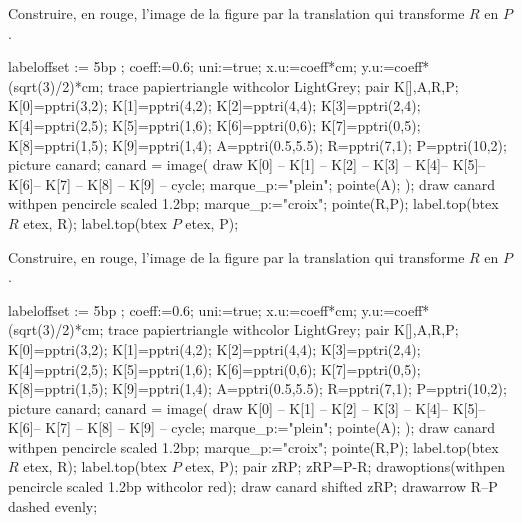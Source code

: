 \begin{exercice*}
    Construire, en rouge, l'image de la figure par la translation qui transforme $R$ en $P$.
    \begin{Geometrie}[CoinHD={(8u,4u)}]
        labeloffset := 5bp ;
        coeff:=0.6;
        uni:=true;
        x.u:=coeff*cm;
        y.u:=coeff*(sqrt(3)/2)*cm;        
        trace papiertriangle withcolor LightGrey;
        pair K[],A,R,P;
        K[0]=pptri(3,2);
        K[1]=pptri(4,2);        
        K[2]=pptri(4,4);
        K[3]=pptri(2,4);
        K[4]=pptri(2,5);
        K[5]=pptri(1,6);
        K[6]=pptri(0,6);
        K[7]=pptri(0,5);
        K[8]=pptri(1,5);
        K[9]=pptri(1,4);
        A=pptri(0.5,5.5);
        R=pptri(7,1);
        P=pptri(10,2);
        picture canard;
        canard = image( 
            draw K[0] -- K[1] -- K[2] -- K[3] -- K[4]-- K[5]-- K[6]-- K[7] -- K[8] -- K[9] -- cycle;
            marque_p:="plein";
            pointe(A);
        );        
        draw canard withpen pencircle scaled 1.2bp;
        marque_p:="croix";
        pointe(R,P);
        label.top(btex $R$ etex, R);
        label.top(btex $P$ etex, P);
    \end{Geometrie}
\end{exercice*}
\begin{corrige}
    Construire, en rouge, l'image de la figure par la translation qui transforme $R$ en $P$.
    \hspace*{-5mm}
    \begin{Geometrie}[CoinHD={(8u,4u)}]
        labeloffset := 5bp ;
        coeff:=0.6;
        uni:=true;
        x.u:=coeff*cm;
        y.u:=coeff*(sqrt(3)/2)*cm;        
        trace papiertriangle withcolor LightGrey;
        pair K[],A,R,P;
        K[0]=pptri(3,2);
        K[1]=pptri(4,2);        
        K[2]=pptri(4,4);
        K[3]=pptri(2,4);
        K[4]=pptri(2,5);
        K[5]=pptri(1,6);
        K[6]=pptri(0,6);
        K[7]=pptri(0,5);
        K[8]=pptri(1,5);
        K[9]=pptri(1,4);
        A=pptri(0.5,5.5);
        R=pptri(7,1);
        P=pptri(10,2);
        picture canard;
        canard = image( 
            draw K[0] -- K[1] -- K[2] -- K[3] -- K[4]-- K[5]-- K[6]-- K[7] -- K[8] -- K[9] -- cycle;
            marque_p:="plein";
            pointe(A);
        );        
        draw canard withpen pencircle scaled 1.2bp;
        marque_p:="croix";
        pointe(R,P);
        label.top(btex $R$ etex, R);
        label.top(btex $P$ etex, P);
        pair zRP;
        zRP=P-R;
        drawoptions(withpen pencircle scaled 1.2bp withcolor red);
        draw canard shifted zRP;
        drawarrow R--P dashed evenly;
    \end{Geometrie}
\end{corrige}

